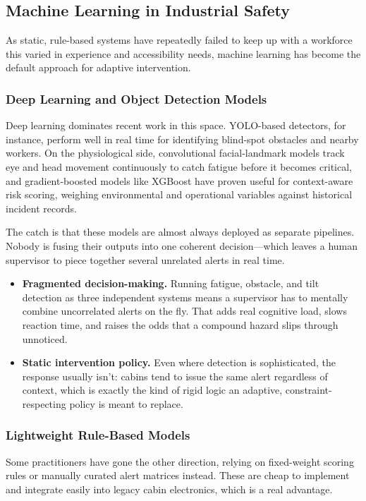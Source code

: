 \subsection{Machine Learning in Industrial Safety}
As static, rule-based systems have repeatedly failed to keep up with a workforce this varied in experience and accessibility needs, machine learning has become the default approach for adaptive intervention.

\subsubsection{Deep Learning and Object Detection Models}
Deep learning dominates recent work in this space. YOLO-based detectors, for instance, perform well in real time for identifying blind-spot obstacles and nearby workers. On the physiological side, convolutional facial-landmark models track eye and head movement continuously to catch fatigue before it becomes critical, and gradient-boosted models like XGBoost have proven useful for context-aware risk scoring, weighing environmental and operational variables against historical incident records.

The catch is that these models are almost always deployed as separate pipelines. Nobody is fusing their outputs into one coherent decision---which leaves a human supervisor to piece together several unrelated alerts in real time.
\begin{itemize}
    \item \textbf{Fragmented decision-making.} Running fatigue, obstacle, and tilt detection as three independent systems means a supervisor has to mentally combine uncorrelated alerts on the fly. That adds real cognitive load, slows reaction time, and raises the odds that a compound hazard slips through unnoticed.
    \item \textbf{Static intervention policy.} Even where detection is sophisticated, the response usually isn't: cabins tend to issue the same alert regardless of context, which is exactly the kind of rigid logic an adaptive, constraint-respecting policy is meant to replace.
\end{itemize}

\subsubsection{Lightweight Rule-Based Models}
Some practitioners have gone the other direction, relying on fixed-weight scoring rules or manually curated alert matrices instead. These are cheap to implement and integrate easily into legacy cabin electronics, which is a real advantage.

